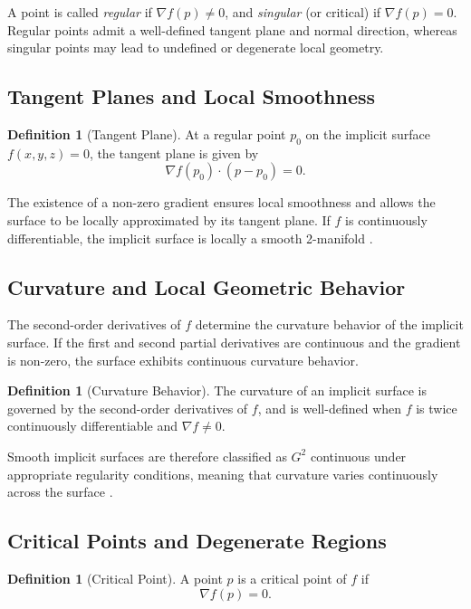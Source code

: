 \documentclass[12pt, a4paper, oneside]{book}
\theoremstyle{plain}
\theoremstyle{definition}
\newtheorem{definition}[theorem]{Definition}
\theoremstyle{remark}
\theoremstyle{definition}
\begin{document}
A point is called \emph{regular} if $\nabla f(p) \neq 0$, and \emph{singular} (or critical) if $\nabla f(p) = 0$. Regular points admit a well-defined tangent plane and normal direction, whereas singular points may lead to undefined or degenerate local geometry.

\subsection{Tangent Planes and Local Smoothness}

\begin{definition}[Tangent Plane]
At a regular point $p_0$ on the implicit surface $f(x,y,z)=0$, the tangent plane is given by
\[
\nabla f(p_0) \cdot (p - p_0) = 0.
\]
\end{definition}

The existence of a non-zero gradient ensures local smoothness and allows the surface to be locally approximated by its tangent plane. If $f$ is continuously differentiable, the implicit surface is locally a smooth 2-manifold \cite{bloomenthal2000implicit}.

\subsection{Curvature and Local Geometric Behavior}

The second-order derivatives of $f$ determine the curvature behavior of the implicit surface. If the first and second partial derivatives are continuous and the gradient is non-zero, the surface exhibits continuous curvature behavior.

\begin{definition}[Curvature Behavior]
The curvature of an implicit surface is governed by the second-order derivatives of $f$, and is well-defined when $f$ is twice continuously differentiable and $\nabla f \neq 0$.
\end{definition}

Smooth implicit surfaces are therefore classified as $G^2$ continuous under appropriate regularity conditions, meaning that curvature varies continuously across the surface \cite{bloomenthal2000implicit}.

\subsection{Critical Points and Degenerate Regions}

\begin{definition}[Critical Point]
A point $p$ is a critical point of $f$ if
\[
\nabla f(p) = 0.
\]
\end{definition}
\end{document}
